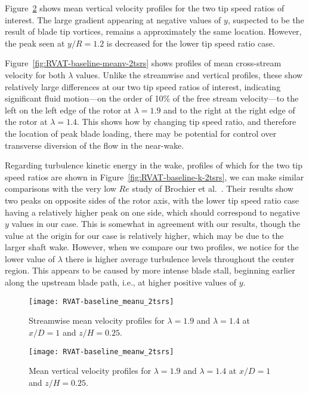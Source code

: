 Figure~\ref{fig:RVAT-baseline-meanw-2tsrs} shows mean vertical velocity profiles
for the two tip speed ratios of interest. The large gradient appearing at
negative values of $y$, suspected to be the result of blade tip vortices,
remains a approximately the same location. However, the peak seen at $y/R = 1.2$
is decreased for the lower tip speed ratio case.

Figure~\ref{fig:RVAT-baseline-meanv-2tsrs} shows profiles of mean cross-stream
velocity for both $\lambda$ values. Unlike the streamwise and vertical profiles,
these show relatively large differences at our two tip speed ratios of interest,
indicating significant fluid motion---on the order of 10\% of the free stream
velocity---to the left on the left edge of the rotor at $\lambda=1.9$ and to the
right at the right edge of the rotor at $\lambda = 1.4$. This shows how by
changing tip speed ratio, and therefore the location of peak blade loading,
there may be potential for control over transverse diversion of the flow in the
near-wake.

Regarding turbulence kinetic energy in the wake, profiles of which for the two
tip speed ratios are shown in Figure~\ref{fig:RVAT-baseline-k-2tsrs}, we can
make similar comparisons with the very low $Re$ study of Brochier
et al.~\cite{Brochier1986}. Their results show two peaks on opposite sides of the
rotor axis, with the lower tip speed ratio case having a relatively higher peak
on one side, which should correspond to negative $y$ values in our case. This is
somewhat in agreement with our results, though the value at the origin for our
case is relatively higher, which may be due to the larger shaft wake. However,
when we compare our two profiles, we notice for the lower value of $\lambda$
there is higher average turbulence levels throughout the center region. This
appears to be caused by more intense blade stall, beginning earlier along the
upstream blade path, i.e., at higher positive values of $y$.

\begin{figure}
    \centering
    
    \texttt{[image: RVAT-baseline\_meanu\_2tsrs]}

    \caption{Streamwise mean velocity profiles for $\lambda = 1.9$ and
        $\lambda=1.4$ at $x/D=1$ and $z/H = 0.25$.}

    \label{fig:RVAT-baseline-meanu-2tsrs} 
\end{figure}

\begin{figure}
    \centering
    
    \texttt{[image: RVAT-baseline\_meanw\_2tsrs]}

    \caption{Mean vertical velocity profiles for $\lambda = 1.9$ and
        $\lambda=1.4$ at $x/D=1$ and $z/H = 0.25$.}

    \label{fig:RVAT-baseline-meanw-2tsrs} 
\end{figure}

